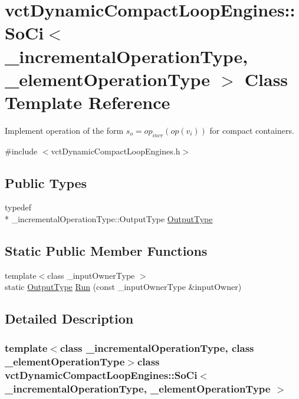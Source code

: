 \hypertarget{classvct_dynamic_compact_loop_engines_1_1_so_ci}{\section{vct\-Dynamic\-Compact\-Loop\-Engines\-:\-:So\-Ci$<$ \-\_\-incremental\-Operation\-Type, \-\_\-element\-Operation\-Type $>$ Class Template Reference}
\label{classvct_dynamic_compact_loop_engines_1_1_so_ci}
}


Implement operation of the form $s_o = op_{incr}(op(v_i))$ for compact containers.  




{\ttfamily \#include $<$vct\-Dynamic\-Compact\-Loop\-Engines.\-h$>$}

\subsection*{Public Types}
\begin{DoxyCompactItemize}
\item 
typedef \\*
\-\_\-incremental\-Operation\-Type\-::\-Output\-Type \hyperlink{classvct_dynamic_compact_loop_engines_1_1_so_ci_a85a6c1ae9a5df9099423b58d318280b4}{Output\-Type}
\end{DoxyCompactItemize}
\subsection*{Static Public Member Functions}
\begin{DoxyCompactItemize}
\item 
{\footnotesize template$<$class \-\_\-input\-Owner\-Type $>$ }\\static \hyperlink{classvct_dynamic_compact_loop_engines_1_1_so_ci_a85a6c1ae9a5df9099423b58d318280b4}{Output\-Type} \hyperlink{classvct_dynamic_compact_loop_engines_1_1_so_ci_aab14f62a74be913a13551e575122ca91}{Run} (const \-\_\-input\-Owner\-Type \&input\-Owner)
\end{DoxyCompactItemize}


\subsection{Detailed Description}
\subsubsection*{template$<$class \-\_\-incremental\-Operation\-Type, class \-\_\-element\-Operation\-Type$>$class vct\-Dynamic\-Compact\-Loop\-Engines\-::\-So\-Ci$<$ \-\_\-incremental\-Operation\-Type, \-\_\-element\-Operation\-Type $>$}

